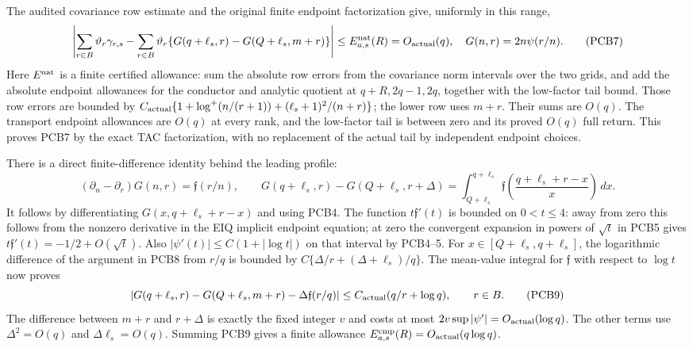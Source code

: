 The audited covariance row estimate and the original finite endpoint
factorization give, uniformly in this range,
\[
 \left|\sum_{r\in B}\vartheta_r\gamma_{r,s}
  -\sum_{r\in B}\vartheta_r
    \{G(q+\ell_s,r)-G(Q+\ell_s,m+r)\}\right|
 \le E^{\rm nat}_{a,s}(R)=O_{\rm actual}(q),
 \quad G(n,r)=2n\psi(r/n).
 \tag{PCB7}
\]
Here $E^{\rm nat}$ is a finite certified allowance: sum the absolute
row errors from the covariance norm intervals over the two grids, and add
the absolute endpoint allowances for the conductor and analytic quotient
at $q+R,2q-1,2q$, together with the low-factor tail bound. Those row errors
are bounded by
$C_{\rm actual}\{1+\log^+(n/(r+1))+
(\ell_s+1)^2/(n+r)\}$; the lower row uses $m+r$.
Their sums are $O(q)$. The transport endpoint allowances are $O(q)$
at every rank, and the low-factor tail is between zero and its proved
$O(q)$ full return. This proves PCB7 by the exact TAC factorization,
with no replacement of the actual tail by independent endpoint choices.

There is a direct finite-difference identity behind the leading profile:
\[
 (\partial_n-\partial_r)G(n,r)=\mathfrak f(r/n),\qquad
 G(q+\ell_s,r)-G(Q+\ell_s,r+\Delta)
 =\int_{Q+\ell_s}^{q+\ell_s}
  \mathfrak f\!\left(\frac{q+\ell_s+r-x}{x}\right)\,dx.
 \tag{PCB8}
\]
It follows by differentiating $G(x,q+\ell_s+r-x)$ and using PCB4.
The function $t\mathfrak f'(t)$ is bounded on $0<t\le4$:
away from zero this follows from the nonzero derivative in the EIQ
implicit endpoint equation; at zero the convergent expansion in powers
of $\sqrt t$ in PCB5 gives $t\mathfrak f'(t)=-1/2+O(\sqrt t)$.
Also $|\psi'(t)|\le C(1+|\log t|)$ on that interval by PCB4--5.
For $x\in[Q+\ell_s,q+\ell_s]$, the logarithmic difference of the
argument in PCB8 from $r/q$ is bounded by
$C\{\Delta/r+(\Delta+\ell_s)/q\}$. The mean-value integral for
$\mathfrak f$ with respect to $\log t$ now proves
\[
 \left|G(q+\ell_s,r)-G(Q+\ell_s,m+r)
                 -\Delta\mathfrak f(r/q)\right|
 \le C_{\rm actual}(q/r+\log q),\qquad r\in B.
 \tag{PCB9}
\]
The difference between $m+r$ and $r+\Delta$ is exactly the fixed integer
$v$ and costs at most $2v\sup|\psi'|=O_{\rm actual}(\log q)$.
The other terms use $\Delta^2=O(q)$ and $\Delta\ell_s=O(q)$.
Summing PCB9 gives a finite allowance
$E^{\rm cmp}_{a,s}(R)=O_{\rm actual}(q\log q)$.

